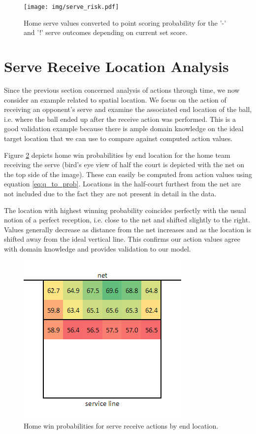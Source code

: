 \documentclass{sfuthesis}
\begin{document}
	\begin{figure}
		\centering
		\texttt{[image: img/serve\_risk.pdf]}
		\caption{Home serve values converted to point scoring probability for the '-' and '!' serve outcomes depending on current set score.}
		\label{fig:serve-risk}
	\end{figure}
	
	\section{Serve Receive Location Analysis}
	
	Since the previous section concerned analysis of actions through time, we now consider an example related to spatial location. We focus on the action of receiving an opponent's serve and examine the associated end location of the ball, i.e. where the ball ended up after the receive action was performed. This is a good validation example because there is ample domain knowledge on the ideal target location that we can use to compare against computed action values.
	
	Figure \ref{fig:pass-location} depicts home win probabilities by end location for the home team receiving the serve (bird's eye view of half the court is depicted with the net on the top side of the image). These can easily be computed from action values using equation \eqref{eq:q_to_prob}. Locations in the half-court furthest from the net are not included due to the fact they are not present in detail in the data.
	
	The location with highest winning probability coincides perfectly with the usual notion of a perfect reception, i.e. close to the net and shifted slightly to the right. Values generally decrease as distance from the net increases and as the location is shifted away from the ideal vertical line. This confirms our action values agree with domain knowledge and provides validation to our model.
	
	\begin{figure}[ht]
		\centering
		\includegraphics[scale=0.8]{img/pass_locations.png}
		\caption{Home win probabilities for serve receive actions by end location.}
		\label{fig:pass-location}
	\end{figure}
	
\end{document}
